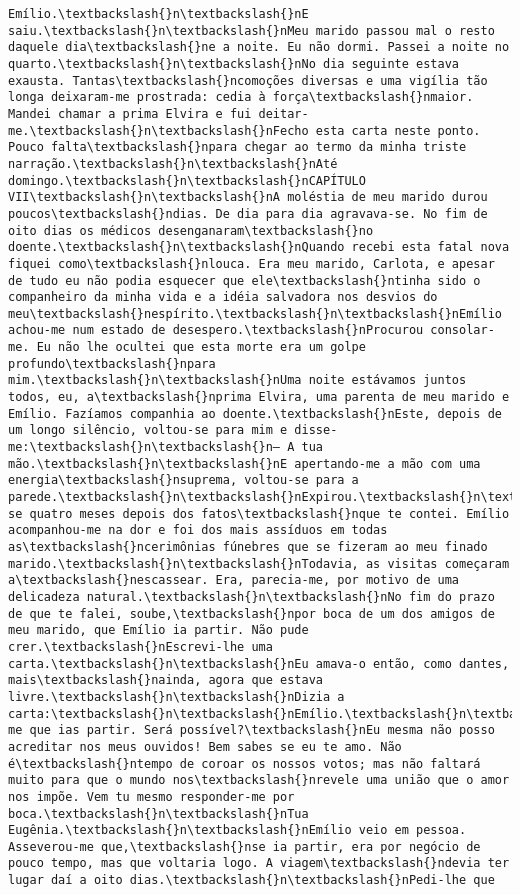 \documentclass[11pt]{article}
\begin{document}
\begin{Verbatim}[commandchars=\\\{\}]
Emílio.\textbackslash{}n\textbackslash{}nE saiu.\textbackslash{}n\textbackslash{}nMeu marido passou mal o resto daquele dia\textbackslash{}ne a noite. Eu não dormi. Passei a noite no quarto.\textbackslash{}n\textbackslash{}nNo dia seguinte estava exausta. Tantas\textbackslash{}ncomoções diversas e uma vigília tão longa deixaram-me prostrada: cedia à força\textbackslash{}nmaior. Mandei chamar a prima Elvira e fui deitar-me.\textbackslash{}n\textbackslash{}nFecho esta carta neste ponto. Pouco falta\textbackslash{}npara chegar ao termo da minha triste narração.\textbackslash{}n\textbackslash{}nAté domingo.\textbackslash{}n\textbackslash{}nCAPÍTULO VII\textbackslash{}n\textbackslash{}nA moléstia de meu marido durou poucos\textbackslash{}ndias. De dia para dia agravava-se. No fim de oito dias os médicos desenganaram\textbackslash{}no doente.\textbackslash{}n\textbackslash{}nQuando recebi esta fatal nova fiquei como\textbackslash{}nlouca. Era meu marido, Carlota, e apesar de tudo eu não podia esquecer que ele\textbackslash{}ntinha sido o companheiro da minha vida e a idéia salvadora nos desvios do meu\textbackslash{}nespírito.\textbackslash{}n\textbackslash{}nEmílio achou-me num estado de desespero.\textbackslash{}nProcurou consolar-me. Eu não lhe ocultei que esta morte era um golpe profundo\textbackslash{}npara mim.\textbackslash{}n\textbackslash{}nUma noite estávamos juntos todos, eu, a\textbackslash{}nprima Elvira, uma parenta de meu marido e Emílio. Fazíamos companhia ao doente.\textbackslash{}nEste, depois de um longo silêncio, voltou-se para mim e disse-me:\textbackslash{}n\textbackslash{}n— A tua mão.\textbackslash{}n\textbackslash{}nE apertando-me a mão com uma energia\textbackslash{}nsuprema, voltou-se para a parede.\textbackslash{}n\textbackslash{}nExpirou.\textbackslash{}n\textbackslash{}n{\ldots}\textbackslash{}n\textbackslash{}nPassaram-se quatro meses depois dos fatos\textbackslash{}nque te contei. Emílio acompanhou-me na dor e foi dos mais assíduos em todas as\textbackslash{}ncerimônias fúnebres que se fizeram ao meu finado marido.\textbackslash{}n\textbackslash{}nTodavia, as visitas começaram a\textbackslash{}nescassear. Era, parecia-me, por motivo de uma delicadeza natural.\textbackslash{}n\textbackslash{}nNo fim do prazo de que te falei, soube,\textbackslash{}npor boca de um dos amigos de meu marido, que Emílio ia partir. Não pude crer.\textbackslash{}nEscrevi-lhe uma carta.\textbackslash{}n\textbackslash{}nEu amava-o então, como dantes, mais\textbackslash{}nainda, agora que estava livre.\textbackslash{}n\textbackslash{}nDizia a carta:\textbackslash{}n\textbackslash{}nEmílio.\textbackslash{}n\textbackslash{}nConstou-me que ias partir. Será possível?\textbackslash{}nEu mesma não posso acreditar nos meus ouvidos! Bem sabes se eu te amo. Não é\textbackslash{}ntempo de coroar os nossos votos; mas não faltará muito para que o mundo nos\textbackslash{}nrevele uma união que o amor nos impõe. Vem tu mesmo responder-me por boca.\textbackslash{}n\textbackslash{}nTua Eugênia.\textbackslash{}n\textbackslash{}nEmílio veio em pessoa. Asseverou-me que,\textbackslash{}nse ia partir, era por negócio de pouco tempo, mas que voltaria logo. A viagem\textbackslash{}ndevia ter lugar daí a oito dias.\textbackslash{}n\textbackslash{}nPedi-lhe que 
\end{Verbatim}
\end{document}

